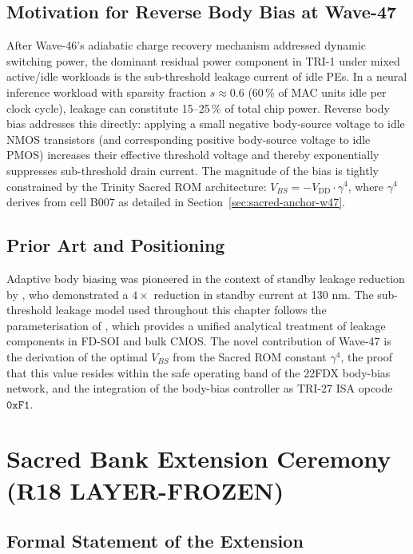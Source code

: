 \subsection{Motivation for Reverse Body Bias at Wave-47}

After Wave-46's adiabatic charge recovery mechanism addressed dynamic switching
power, the dominant residual power component in TRI-1 under mixed
active/idle workloads is the sub-threshold leakage current of idle PEs.
In a neural inference workload with sparsity fraction $s \approx 0.6$
(60\,\% of MAC units idle per clock cycle), leakage can constitute
15--25\,\% of total chip power.
Reverse body bias addresses this directly: applying a small negative
body-source voltage to idle NMOS transistors (and corresponding positive
body-source voltage to idle PMOS) increases their effective threshold voltage
and thereby exponentially suppresses sub-threshold drain current.
The magnitude of the bias is tightly constrained by the Trinity Sacred ROM
architecture: $V_{BS} = -V_{\mathrm{DD}} \cdot \gamma^{4}$, where $\gamma^{4}$
derives from cell B007 as detailed in Section~\ref{sec:sacred-anchor-w47}.

\subsection{Prior Art and Positioning}

Adaptive body biasing was pioneered in the context of standby leakage reduction
by \citep{tschanz_jssc_2002}, who demonstrated a $4\times$ reduction in
standby current at 130 nm.
The sub-threshold leakage model used throughout this chapter follows the
parameterisation of \citep{mukhopadhyay_2009}, which provides a unified
analytical treatment of leakage components in FD-SOI and bulk CMOS.
The novel contribution of Wave-47 is the derivation of the optimal $V_{BS}$
from the Sacred ROM constant $\gamma^{4}$, the proof that this value resides
within the safe operating band of the 22FDX body-bias network, and the
integration of the body-bias controller as TRI-27 ISA opcode $\texttt{0xF1}$.

\section{Sacred Bank Extension Ceremony (R18 LAYER-FROZEN)}
\label{sec:bank-extension-w47}

\subsection{Formal Statement of the Extension}

